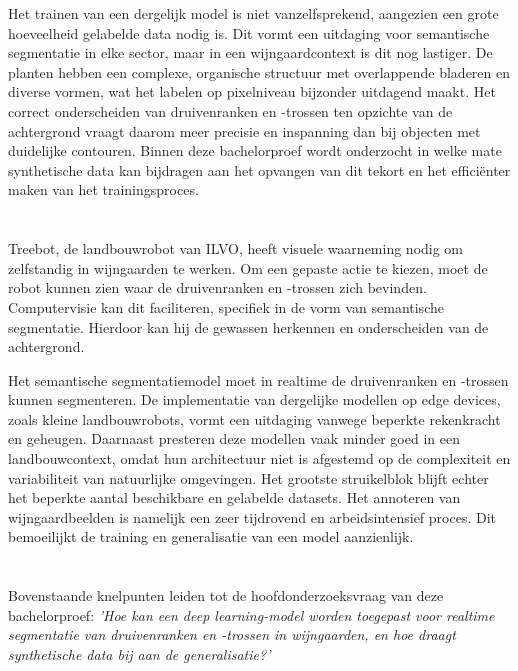 Het trainen van een dergelijk model is niet vanzelfsprekend, aangezien een grote hoeveelheid gelabelde data nodig is. Dit vormt een uitdaging voor semantische segmentatie in elke sector, maar in een wijngaardcontext is dit nog lastiger. De planten hebben een complexe, organische structuur met overlappende bladeren en diverse vormen, wat het labelen op pixelniveau bijzonder uitdagend maakt. Het correct onderscheiden van druivenranken en -trossen ten opzichte van de achtergrond vraagt daarom meer precisie en inspanning dan bij objecten met duidelijke contouren. Binnen deze bachelorproef wordt onderzocht in welke mate synthetische data kan bijdragen aan het opvangen van dit tekort en het efficiënter maken van het trainingsproces.

\section{}%
\label{sec:probleemstelling}

Treebot, de landbouwrobot van ILVO, heeft visuele waarneming nodig om zelfstandig in wijngaarden te werken. Om een gepaste actie te kiezen, moet de robot kunnen zien waar de druivenranken en -trossen zich bevinden. Computervisie kan dit faciliteren, specifiek in de vorm van semantische segmentatie. Hierdoor kan hij de gewassen herkennen en onderscheiden van de achtergrond.

Het semantische segmentatiemodel moet in realtime de druivenranken en -trossen kunnen segmenteren. De implementatie van dergelijke modellen op edge devices, zoals kleine landbouwrobots, vormt een uitdaging vanwege beperkte rekenkracht en geheugen. Daarnaast presteren deze modellen vaak minder goed in een landbouwcontext, omdat hun architectuur niet is afgestemd op de complexiteit en variabiliteit van natuurlijke omgevingen. Het grootste struikelblok blijft echter het beperkte aantal beschikbare en gelabelde datasets. Het annoteren van wijngaardbeelden is namelijk een zeer tijdrovend en arbeidsintensief proces. Dit bemoeilijkt de training en generalisatie van een model aanzienlijk.

\section{}%
\label{sec:onderzoeksvraag}

Bovenstaande knelpunten leiden tot de hoofdonderzoeksvraag van deze bachelorproef: \emph{'Hoe kan een deep learning-model worden toegepast voor realtime segmentatie van druivenranken en -trossen in wijngaarden, en hoe draagt synthetische data bij aan de generalisatie?'} 

